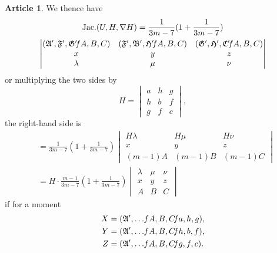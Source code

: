 \documentclass[12pt,a4paper]{article}
\theoremstyle{definition}
\newtheorem{art}{Article}[section]
\DeclareMathOperator{\Jac}{Jac.}
\begin{document}
\begin{art}
We thence have
\begin{multline*}
\Jac(U, H, \nabla H) = \frac{1}{3m - 7}(1 + \frac{1}{3m - 7}) \\
\begin{vmatrix}
(\mathfrak{A}', \mathfrak{F}', \mathfrak{G}' \hspace{-2pt} fA, B, C) & (\mathfrak{F}', \mathfrak{B}', \mathfrak{H}' \hspace{-2pt} fA, B, C) & (\mathfrak{G}', \mathfrak{H}', \mathfrak{C}' \hspace{-2pt} fA, B, C) \\
x & y & z \\
\lambda & \mu & \nu
\end{vmatrix}
\end{multline*}
or multiplying the two sides by
\[
H = \begin{vmatrix} a & h & g \\ h & b & f \\ g & f & c \end{vmatrix},
\]
the right-hand side is
\begin{align*}
&= \frac{1}{3m - 7}(1 + \frac{1}{3m - 7}) \begin{vmatrix} H\lambda & H\mu & H\nu \\ x & y & z \\ (m - 1)A & (m - 1)B & (m - 1)C \end{vmatrix} \\
&= H \cdot \frac{m - 1}{3m - 7}(1 + \frac{1}{3m - 7}) \begin{vmatrix} \lambda & \mu & \nu \\ x & y & z \\ A & B & C \end{vmatrix}
\end{align*}
if for a moment
\begin{align*}
X &= (\mathfrak{A}', \ldots \hspace{-2pt} fA, B, C \hspace{-2pt} fa, h, g), \\
Y &= (\mathfrak{A}', \ldots \hspace{-2pt} fA, B, C \hspace{-2pt} fh, b, f), \\
Z &= (\mathfrak{A}', \ldots \hspace{-2pt} fA, B, C \hspace{-2pt} fg, f, c).
\end{align*}
\end{art}
\end{document}
